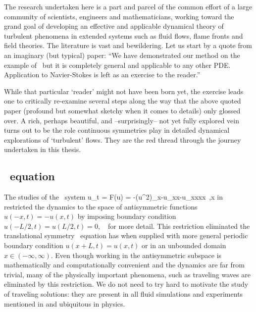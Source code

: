 The research undertaken here is a part and parcel of the
common effort of a large community of scientists, engineers and
mathematicians, working toward the grand goal of developing an effective and
applicable dynamical theory of turbulent phenomena in extended systems
such as fluid flows, flame fronts and field theories.
The literature is vast and bewildering. Let us start by a
quote from an imaginary (but typical) paper: ``We have
demonstrated our method on the example of \KSe\ but it is completely
general and applicable to any other PDE. Application to
Navier-Stokes is left as an exercise to the reader.''

While that particular `reader' might not have been born yet,
the exercise leads one to critically re-examine several steps along the way that
the above quoted paper (profound but somewhat sketchy when it comes to details) only glossed over.
A rich, perhaps beautiful, and --surprisingly--  not yet fully explored
vein turns out to be the role continuous symmetries play in detailed dynamical explorations
of `turbulent' flows. They are the red thread through the journey undertaken in this thesis.

\subsection{\KS\ equation}

The studies of the \KS\ system
\beq
  u_t = F(u) = -{\textstyle{}}(u^2)_x-u_{xx}-u_{xxxx}
    \,,\qquad   x \in [-L/2,L/2]
in  restricted the dynamics
to the space of antisymmetric functions $u(-x,t)=-u(x,t)$ by imposing
boundary condition $u(-L/2,t)=u(L/2,t)=0$, \cf\  for more
detail. This restriction eliminated the translational symmetry \KS\ equation
has when supplied with more general periodic boundary condition $u(x+L,t)=u(x,t)$ or
in an unbounded domain $x\in(-\infty,\infty)$. Even though working in the antisymmetric
subspace is mathematically and computationally convenient and the dynamics are far
from trivial, many of the physically important phenomena,
such as traveling waves are eliminated by this restriction.
We do not need to try hard to motivate the
study of traveling solutions: they are present in all fluid simulations and experiments
mentioned in  and ubiquitous in physics.

